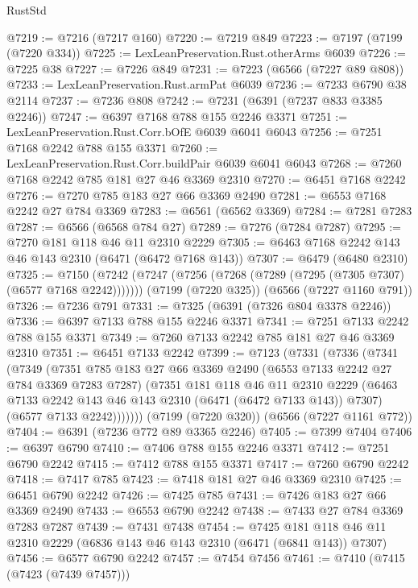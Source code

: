 \begin{lexlean}{RustStd}
\begin{coremodule}
{\begin{coremodule}
{{{{{{{{{{{{{{{{{{{{{{{{{{@7219 := @7216 (@7217 @160)
@7220 := @7219 @849
@7223 := @7197 (@7199 (@7220 @334))
@7225 := LexLeanPreservation.Rust.otherArms @6039
@7226 := @7225 @38
@7227 := @7226 @849
@7231 := @7223 (@6566 (@7227 @89 @808))
@7233 := LexLeanPreservation.Rust.armPat @6039
@7236 := @7233 @6790 @38 @2114
@7237 := @7236 @808
@7242 := @7231 (@6391 (@7237 @833 @3385 @2246))
@7247 := @6397 @7168 @788 @155 @2246 @3371
@7251 := LexLeanPreservation.Rust.Corr.bOfE @6039 @6041 @6043
@7256 := @7251 @7168 @2242 @788 @155 @3371
@7260 := LexLeanPreservation.Rust.Corr.buildPair @6039 @6041 @6043
@7268 := @7260 @7168 @2242 @785 @181 @27 @46 @3369 @2310
@7270 := @6451 @7168 @2242
@7276 := @7270 @785 @183 @27 @66 @3369 @2490
@7281 := @6553 @7168 @2242 @27 @784 @3369
@7283 := @6561 (@6562 @3369)
@7284 := @7281 @7283
@7287 := @6566 (@6568 @784 @27)
@7289 := @7276 (@7284 @7287)
@7295 := @7270 @181 @118 @46 @11 @2310 @2229
@7305 := @6463 @7168 @2242 @143 @46 @143 @2310 (@6471 (@6472 @7168 @143))
@7307 := @6479 (@6480 @2310)
@7325 := @7150
    (@7242 (@7247 (@7256 (@7268 (@7289 (@7295 (@7305 @7307) (@6577 @7168 @2242)))))))
    (@7199 (@7220 @325))
    (@6566 (@7227 @1160 @791))
@7326 := @7236 @791
@7331 := @7325 (@6391 (@7326 @804 @3378 @2246))
@7336 := @6397 @7133 @788 @155 @2246 @3371
@7341 := @7251 @7133 @2242 @788 @155 @3371
@7349 := @7260 @7133 @2242 @785 @181 @27 @46 @3369 @2310
@7351 := @6451 @7133 @2242
@7399 := @7123
    (@7331
      (@7336
        (@7341
          (@7349
            (@7351
              @785
              @183
              @27
              @66
              @3369
              @2490
              (@6553 @7133 @2242 @27 @784 @3369 @7283 @7287)
              (@7351
                @181
                @118
                @46
                @11
                @2310
                @2229
                (@6463 @7133 @2242 @143 @46 @143 @2310 (@6471 (@6472 @7133 @143)) @7307)
                (@6577 @7133 @2242)))))))
    (@7199 (@7220 @320))
    (@6566 (@7227 @1161 @772))
@7404 := @6391 (@7236 @772 @89 @3365 @2246)
@7405 := @7399 @7404
@7406 := @6397 @6790
@7410 := @7406 @788 @155 @2246 @3371
@7412 := @7251 @6790 @2242
@7415 := @7412 @788 @155 @3371
@7417 := @7260 @6790 @2242
@7418 := @7417 @785
@7423 := @7418 @181 @27 @46 @3369 @2310
@7425 := @6451 @6790 @2242
@7426 := @7425 @785
@7431 := @7426 @183 @27 @66 @3369 @2490
@7433 := @6553 @6790 @2242
@7438 := @7433 @27 @784 @3369 @7283 @7287
@7439 := @7431 @7438
@7454 := @7425 @181 @118 @46 @11 @2310 @2229 (@6836 @143 @46 @143 @2310 (@6471 (@6841 @143)) @7307)
@7456 := @6577 @6790 @2242
@7457 := @7454 @7456
@7461 := @7410 (@7415 (@7423 (@7439 @7457)))
}}}}}}}}}}}}}}}}}}}}}}}}}}
\end{coremodule}}
\end{coremodule}
\end{lexlean}
